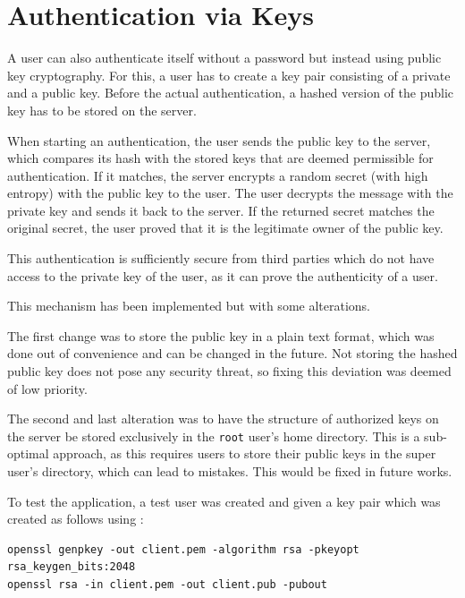 \documentclass[10pt,a4paper,titlepage,twoside,english,final]{zhawreprt}
\begin{document}
\section{Authentication via Keys}\label{sec:ImplAuthViaKeys}
A user can also authenticate itself without a password but instead using public key cryptography.
For this, a user has to create a key pair consisting of a private and a public key.
Before the actual authentication, a hashed version of the public key has to be stored on the server.

When starting an authentication, the user sends the public key to the server, which compares its hash with the stored keys that are deemed permissible for authentication.
If it matches, the server encrypts a random secret (with high entropy) with the public key to the user.
The user decrypts the message with the private key and sends it back to the server.
If the returned secret matches the original secret, the user proved that it is the legitimate owner of the public key.

This authentication is sufficiently secure from third parties which do not have access to the private key of the user, as it can prove the authenticity of a user.

This mechanism has been implemented but with some alterations.

The first change was to store the public key in a plain text format, which was done out of convenience and can be changed in the future.
Not storing the hashed public key does not pose any security threat, so fixing this deviation was deemed of low priority.

The second and last alteration was to have the structure of authorized keys on the server be stored exclusively in the \texttt{root} user's home directory.
This is a sub-optimal approach, as this requires users to store their public keys in the super user's directory, which can lead to mistakes.
This would be fixed in future works.

To test the application, a test user was created and given a key pair which was created as follows using \cite{openssl}:

\setlistingBash
\begin{lstlisting}[caption={Generating a key pair for the client},label=lst:GenClientKeyPair,deletekeywords={in}]
openssl genpkey -out client.pem -algorithm rsa -pkeyopt rsa_keygen_bits:2048
openssl rsa -in client.pem -out client.pub -pubout
\end{lstlisting}
\end{document}
